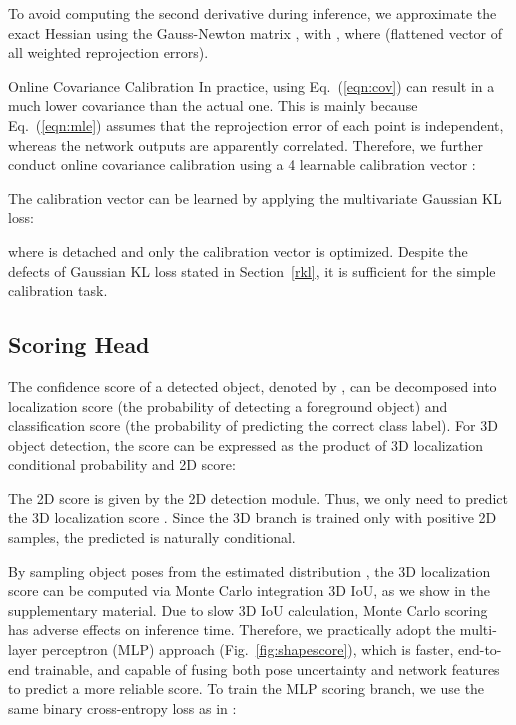 \documentclass[10pt,twocolumn,letterpaper]{article}
\makeatletter
\renewcommand{\paragraph}{
  \@startsection{paragraph}{4}
  {\z@}{0.7ex \@plus .2ex \@minus .1ex}{-1em}
  {\normalfont\normalsize\bfseries}
}
\makeatother
\begin{document}
To avoid computing the second derivative during inference, we approximate the exact Hessian using the Gauss-Newton matrix , with , where  (flattened vector of all weighted reprojection errors). 

\paragraph{Online Covariance Calibration}
In practice, using Eq.~(\ref{eqn:cov}) can result in a much lower covariance than the actual one. This is mainly because Eq.~(\ref{eqn:mle}) assumes that the reprojection error of each point is independent, whereas the network outputs are apparently correlated. Therefore, we further conduct online covariance calibration using a 4 learnable calibration vector :

The calibration vector can be learned by applying the multivariate Gaussian KL loss:

where  is detached and only the calibration vector is optimized. Despite the defects of Gaussian KL loss stated in Section~\ref{rkl}, it is sufficient for the simple calibration task. 

\subsection{Scoring Head}
The confidence score of a detected object, denoted by , 
can be decomposed into localization score  (the probability of detecting a foreground object) and classification score  (the probability of predicting the correct class label). For 3D object detection, the score can be expressed as the product of 3D localization conditional probability and 2D score:

The 2D score  is given by the 2D detection module. Thus, we only need to predict the 3D localization score . Since the 3D branch is trained only with positive 2D samples, the predicted  is naturally conditional.

By sampling object poses from the estimated distribution , the 3D localization score can be computed via Monte Carlo integration \wrt 3D IoU, as we show in the supplementary material. Due to slow 3D IoU calculation, Monte Carlo scoring has adverse effects on inference time. Therefore, we practically adopt the multi-layer perceptron (MLP) approach (Fig.~\ref{fig:shapescore}), which is faster, end-to-end trainable, and capable of fusing both pose uncertainty and network features to predict a more reliable score. To train the MLP scoring branch, we use the same binary cross-entropy loss as in \cite{pvrcnn, parta2}:
\end{document}
